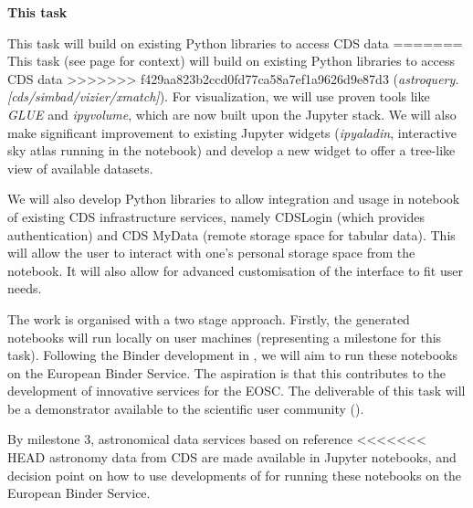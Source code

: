 \begin{task}[
  title=Demonstrator: Astronomy,
  id=astro,
  lead=CDS,
  PM=18,
  wphases={18-42},
  partners={EGI,INSERM,QS,SRL,WTT,XFEL}
]
  \textbf{This task}

  This task will build on existing Python libraries to access CDS data
=======
  This task (see page \pageref{sec:concept-demonstrator-astronomy} for
  context) will build on existing Python libraries to access CDS data
>>>>>>> f429aa823b2ccd0fd77ca58a7ef1a9626d9e87d3
  (\textit{astroquery.[cds/simbad/vizier/xmatch]}). For visualization, we will
  use proven tools like \textit{GLUE} and \textit{ipyvolume}, which are now
  built upon the Jupyter stack.
  We will also make significant improvement to existing Jupyter widgets
  (\textit{ipyaladin}, interactive sky atlas running in the notebook) and
  develop a new widget to offer a tree-like view of available
  datasets.

  We will also develop Python libraries to allow integration and usage in
  notebook of existing CDS infrastructure services, namely CDSLogin (which
  provides authentication) and CDS MyData (remote storage space for tabular
  data).
  This will allow the user to interact with one's personal storage space from
  the notebook. It will also allow for advanced customisation of the interface
  to fit user needs.

  The work is organised with a two stage approach. Firstly, the generated
  notebooks will run locally on user machines (representing a milestone for
  this task). Following the Binder development in , we will aim
  to run these notebooks on the European Binder Service. The aspiration is
  that this contributes to the development of innovative services for the EOSC.
  The deliverable of this task will be a demonstrator available to the
  scientific user community ().

  By milestone 3, astronomical data services based on reference
<<<<<<< HEAD
  astronomy data from CDS are made available in Jupyter notebooks, and
  decision point on how to use developments of  for running these
  notebooks on the European Binder Service.


\end{task}
